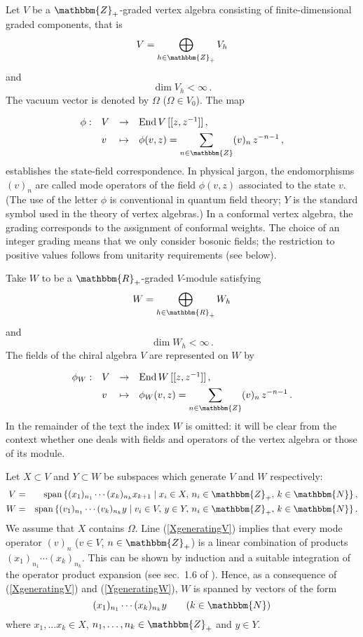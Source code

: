 \documentclass[a4paper,12pt,twoside]{article}
\newcommand{\DS}{\displaystyle}
\newcommand{\bZ}{\mathbbm{Z}}
\newcommand{\bN}{\mathbbm{N}}
\newcommand{\bR}{\mathbbm{R}}
\newcommand{\End}{{\rm End\,}}
\newcommand{\Span}{{\rm span\,}}
\newcommand{\eq}[1]{(\ref{#1})}
\begin{document}
Let $V$ be a $\bZ_+$-graded vertex algebra consisting of finite-dimensional
graded components, that is
$$V = \bigoplus_{h\in\bZ_+} V_h$$
and
$$\dim V_h < \infty\,.$$
The vacuum vector
is denoted by $\Omega$ ($\Omega\in V_0$).
The map
$$
\renewcommand{\arraystretch}{1.5}
\begin{array}{llll}
\phi: & V & \to & \End V\,[[z,z^{-1}]]\,, \\
& v & \mapsto & \DS \phi(v,z) = \sum\limits_{n\in\bZ} (v)_n\, z^{- n - 1}\,,
\end{array}
$$
establishes the state-field correspondence.
In physical jargon, the endomorphisms
$(v)_n$ are called mode operators of the
field $\phi(v,z)$ associated
to the state $v$.
(The use of the letter $\phi$ is conventional in
quantum field theory; $Y$ is the standard symbol used in the theory of
vertex algebras.)
In a conformal vertex algebra, the grading corresponds to the
assignment of conformal weights.
The choice of an integer grading means that we only consider
bosonic fields; the restriction to positive values follows from
unitarity requirements (see below).

Take $W$ to be a $\bR_+$-graded $V$-module \cite{Frenkel}
satisfying
$$W = \bigoplus_{h\in\bR_+} W_h$$
and
$$\dim W_h < \infty\,.$$
The fields of the chiral algebra $V$ are represented on $W$ by
$$
\renewcommand{\arraystretch}{1.5}
\begin{array}{llll}
\phi_W: & V & \to & \End W\,[[z,z^{-1}]]\,, \\
& v & \mapsto & \DS \phi_W(v,z) = \sum\limits_{n\in\bZ} (v)_n\, z^{- n - 1}\,.
\end{array}
$$
In the remainder of the text the index $W$ is omitted:
it will be clear from the context whether one deals with
fields and operators of the vertex algebra or those of its module.

Let $X\subset V$ and $Y\subset W$
be
subspaces which generate $V$ and $W$
respectively: \setlength{\jot}{4mm}
\begin{eqnarray}
\label{XgeneratingV}
V & = & \Span\{(x_1)_{n_1}\cdots (x_k)_{n_k}x_{k+1}\;|\;x_i\in
X,\,n_i\in\bZ_+,\,k\in\bN\}\,, \\
\label{YgeneratingW}
W & = & \Span\{(v_1)_{n_1}\cdots (v_k)_{n_k}y\;|\;v_i\in
V,\,y\in Y,\,n_i\in\bZ_+,\,k\in\bN\}\,.
\end{eqnarray} \setlength{\jot}{2.5mm}
We assume that $X$ contains $\Omega$. Line
\eq{XgeneratingV} implies that every mode operator $(v)_n$ ($v\in V$, $n\in\bZ_+$) is a linear
combination of products $(x_1)_{n_1}\cdots (x_k)_{n_k}$. %
This can be shown by induction and a suitable
integration of the operator product expansion
(see sec.\ 1.6 of \cite{Frenkel}).
Hence, as a consequence of \eq{XgeneratingV} and \eq{YgeneratingW}, $W$
is spanned by vectors of the form
$$(x_1)_{n_1}\cdots (x_k)_{n_k} y\qquad (k\in\bN)$$
where $x_1,\ldots x_k\in X$, $n_1,\ldots, n_k\in\bZ_+$ and $y\in Y$.
\end{document}
